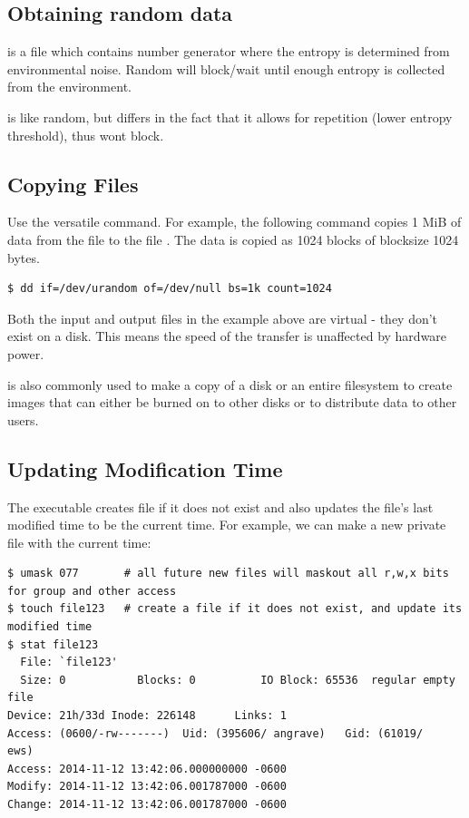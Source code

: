 \subsection{Obtaining random data}

 is a file which contains number generator where the entropy is determined from environmental noise. Random will block/wait until enough entropy is collected from the environment.

 is like random, but differs in the fact that it allows for repetition (lower entropy threshold), thus wont block.


\subsection{Copying Files}

Use the versatile  command. For example, the following command copies 1 MiB of data from the file  to the file . The data is copied as 1024 blocks of blocksize 1024 bytes.

\begin{verbatim}
$ dd if=/dev/urandom of=/dev/null bs=1k count=1024
\end{verbatim}

Both the input and output files in the example above are virtual - they don't exist on a disk. This means the speed of the transfer is unaffected by hardware power.

 is also commonly used to make a copy of a disk or an entire filesystem to create images that can either be burned on to other disks or to distribute data to other users.

\subsection{Updating Modification Time}

The  executable creates file if it does not exist and also updates the file's last modified time to be the current time. For example, we can make a new private file with the current time:

\begin{verbatim}
$ umask 077       # all future new files will maskout all r,w,x bits for group and other access
$ touch file123   # create a file if it does not exist, and update its modified time
$ stat file123
  File: `file123'
  Size: 0           Blocks: 0          IO Block: 65536  regular empty file
Device: 21h/33d Inode: 226148      Links: 1
Access: (0600/-rw-------)  Uid: (395606/ angrave)   Gid: (61019/     ews)
Access: 2014-11-12 13:42:06.000000000 -0600
Modify: 2014-11-12 13:42:06.001787000 -0600
Change: 2014-11-12 13:42:06.001787000 -0600
\end{verbatim}

